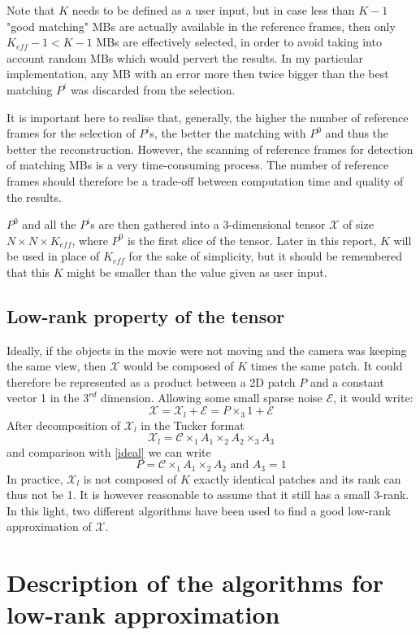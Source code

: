 \documentclass[a4paper, 11pt]{article} %
\def \be {\begin{equation*}}
\def \ee {\end{equation*}}
\def \bee {\begin{equation}}
\def \eee {\end{equation}}
\def \X {\mathcal{X}}
\def \t {\times}
\def \C {\mathcal{C}}
\def \E {\mathcal{E}}
\def \Xl {\mathcal{X}_{l}}
\begin{document}
Note that $K$ needs to be defined as a user input, but in case less than $K-1$ "good matching" MBs are actually available in the reference frames, then only $K_{eff}-1<K-1$ MBs are effectively selected, in order to avoid taking into account random MBs which would pervert the results. 
In my particular implementation, any MB with an error more then twice bigger than the best matching $P^i$ was discarded from the selection.

It is important here to realise that, generally, the higher the number of reference frames for the selection of $P^i$s, the better the matching with $P^0$ and thus the better the reconstruction. However, the scanning of reference frames for detection of matching MBs is a very time-consuming process. The number of reference frames should therefore be a trade-off between computation time and quality of the results. 

$P^0$ and all the $P^i$s are then gathered into a 3-dimensional tensor $\X$ of size $N\t N\t K_{eff}$, where $P^0$ is the first slice of the tensor. Later in this report, $K$ will be used in place of $K_{eff}$ for the sake of simplicity, but it should be remembered that this $K$ might be smaller than the value given as user input.

\subsection{Low-rank property of the tensor}
\label{subsecIdeal}

Ideally, if the objects in the movie were not moving and the camera was keeping the same view, then $\X$ would be composed of $K$ times the same patch. It could therefore be represented as a product between a 2D patch $P$ and a constant vector 1 in the $3^{rd}$ dimension. Allowing some small sparse noise $\mathcal{E}$, it would write:
\bee
\X= \Xl+\E=P\t_3 1+\E
\label{ideal}
\eee
After decomposition of $\Xl$ in the Tucker format
\be
\X_l=\C\t_1 A_1 \t_2 A_2 \t_3 A_3
\ee
and comparison with \autoref{ideal} we can write
\be
P=\C \t_1 A_1\t_2 A_2 \mbox{ and } A_3=1
\ee
In practice, $\Xl$ is not composed of $K$ exactly identical patches and its rank can thus not be 1. It is however reasonable to assume that it still has a small 3-rank. In this light, two different algorithms have been used to find a good low-rank approximation of $\X$.

\section{Description of the algorithms for low-rank approximation}
\end{document}
